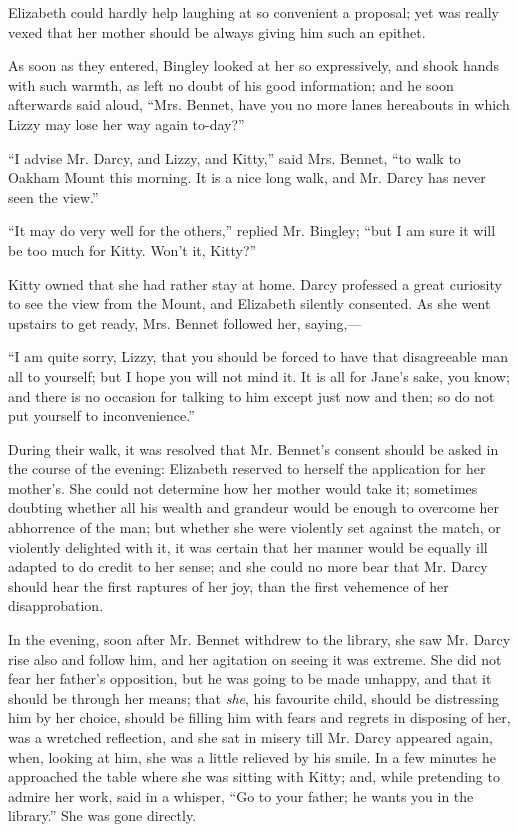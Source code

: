 Elizabeth could hardly help laughing at so convenient a proposal; yet was really vexed that her mother should be always giving him such an epithet.

As soon as they entered, Bingley looked at her so expressively, and shook hands with such warmth, as left no doubt of his good information; and he soon afterwards said aloud, ``Mrs. Bennet, have you no more lanes hereabouts in which Lizzy may lose her way again to-day?''

``I advise Mr. Darcy, and Lizzy, and Kitty,'' said Mrs. Bennet, ``to walk to Oakham Mount this morning. It is a nice long walk, and Mr. Darcy has never seen the view.''

``It may do very well for the others,'' replied Mr. Bingley; ``but I am sure it will be too much for Kitty. Won't it, Kitty?''

Kitty owned that she had rather stay at home. Darcy professed a great curiosity to see the view from the Mount, and Elizabeth silently consented. As she went upstairs to get ready, Mrs. Bennet followed her, saying,---

``I am quite sorry, Lizzy, that you should be forced to have that disagreeable man all to yourself; but I hope you will not mind it. It is all for Jane's sake, you know; and there is no occasion for talking to him except just now and then; so do not put yourself to inconvenience.''

During their walk, it was resolved that Mr. Bennet's consent should be asked in the course of the evening: Elizabeth reserved to herself the application for her mother's. She could not determine how her mother would take it; sometimes doubting whether all his wealth and grandeur would be enough to overcome her abhorrence of the man; but whether she were violently set against the match, or violently delighted with it, it was certain that her manner would be equally ill adapted to do credit to her sense; and she could no more bear that Mr. Darcy should hear the first raptures of her joy, than the first vehemence of her disapprobation.

In the evening, soon after Mr. Bennet withdrew to the library, she saw Mr. Darcy rise also and follow him, and her agitation on seeing it was extreme. She did not fear her father's opposition, but he was going to be made unhappy, and that it should be through her means; that \textit{she}, his favourite child, should be distressing him by her choice, should be filling him with fears and regrets in disposing of her, was a wretched reflection, and she sat in misery till Mr. Darcy appeared again, when, looking at him, she was a little relieved by his smile. In a few minutes he approached the table where she was sitting with Kitty; and, while pretending to admire her work, said in a whisper, ``Go to your father; he wants you in the library.'' She was gone directly.

